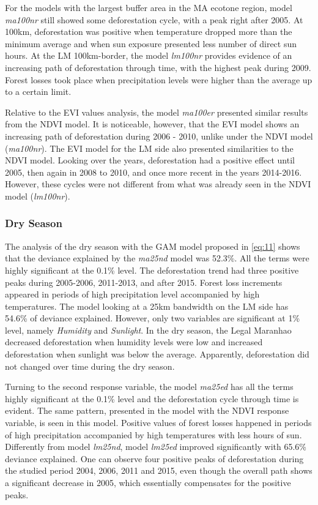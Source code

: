 For the models with the largest buffer area in the MA ecotone region, model \textit{ma100nr} still showed some deforestation cycle, with a peak right after 2005. At 100km, deforestation was positive when temperature dropped more than the minimum average and when sun exposure presented less number of direct sun hours. At the LM 100km-border, the model \textit{lm100nr} provides evidence of an increasing path of deforestation through time, with the highest peak during 2009. Forest losses took place when precipitation levels were higher than the average up to a certain limit. 

Relative to the EVI values analysis, the model \textit{ma100er} presented similar results from the NDVI model. It is noticeable, however, that the EVI model shows an increasing path of deforestation during 2006 - 2010, unlike under the NDVI model (\textit{ma100nr}). The EVI model for the LM side also presented similarities to the NDVI model. Looking over the years, deforestation had a positive effect until 2005, then again in 2008 to 2010, and once more recent in the years 2014-2016. However, these cycles were not different from what was already seen in the NDVI model (\textit{lm100nr}).


\subsubsection{Dry Season}

The analysis of the dry season with the GAM model proposed in \ref{eq:11} shows that the deviance explained by the \textit{ma25nd} model was 52.3\%. All the terms were highly significant at the 0.1\% level. The deforestation trend had three positive peaks during 2005-2006, 2011-2013, and after 2015. Forest loss increments appeared in periods of high precipitation level accompanied by high temperatures. The model looking at a 25km bandwidth on the LM side has 54.6\% of deviance explained. However, only two variables are significant at 1\% level, namely \textit{Humidity} and \textit{Sunlight}. In the dry season, the Legal Maranhao decreased deforestation when humidity levels were low and increased deforestation when sunlight was below the average. Apparently, deforestation did not changed over time during the dry season. 

Turning to the second response variable, the model \textit{ma25ed} has all the terms highly significant at the 0.1\% level and the deforestation cycle through time is evident. The same pattern, presented in the model with the NDVI response variable, is seen in this model. Positive values of forest losses happened in periods of high precipitation accompanied by high temperatures with less hours of sun. Differently from model \textit{lm25nd}, model \textit{lm25ed} improved significantly with 65.6\% deviance explained. One can observe four positive peaks of deforestation during the studied period 2004, 2006, 2011 and 2015, even though the overall path shows a significant decrease in 2005, which essentially compensates for the positive peaks. 

